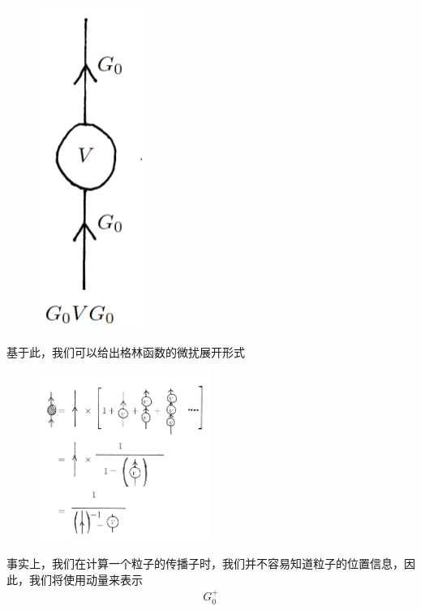 \documentclass{article}
\begin{document}
\begin{figure}[H]
\begin{minipage}{0.3\textwidth}
    \end{minipage}
    \hfill
    \begin{minipage}{0.3\textwidth}
        \centering
        \includegraphics[width = 0.3\textwidth]{figure/一阶微扰格林函数.png}
    \end{minipage}
\end{figure}

基于此，我们可以给出格林函数的微扰展开形式
\begin{figure}[hbpt]
    \centering
    \includegraphics[width = 0.5\textwidth]{figure/格林函数微扰展开.png}
\end{figure}





事实上，我们在计算一个粒子的传播子时，我们并不容易知道粒子的位置信息，因此，我们将使用动量来表示
\begin{align*}
    G^{+}_0
\end{align*}
\end{document}
